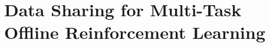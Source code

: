 \documentclass[../thesis.tex]{subfiles}
\begin{document}
\vspace{-0.2cm}
\section{Data Sharing for Multi-Task Offline Reinforcement Learning}    
\label{sec:cds_section}
\vspace{-0.2cm}

% 








    
    

\end{document}
